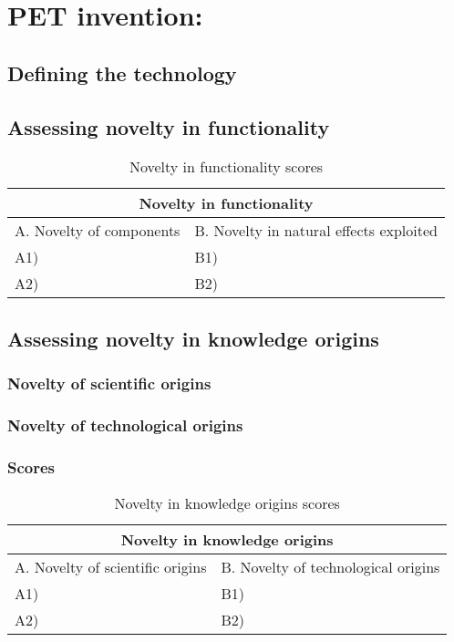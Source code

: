 \section{PET invention: }
\subsection{Defining the technology}

\subsection{Assessing novelty in functionality}
\begin{table}[h]
\centering
\begin{tabular}{l l}
\hline
\multicolumn{2}{|c|}{Novelty in functionality} \\
\hline
A. Novelty of components & B. Novelty in natural effects exploited\\
A1) & B1)\\ 
A2) & B2)\\ 
\hline
\end{tabular}
\caption{Novelty in functionality scores}
\label{tbl:funcscores4}
\end{table}

\subsection{Assessing novelty in knowledge origins}
\subsubsection{Novelty of scientific origins}

\subsubsection{Novelty of technological origins}

\subsubsection{Scores}
\begin{table}[h]
\centering
\begin{tabular}{l l}
\hline
\multicolumn{2}{|c|}{Novelty in knowledge origins} \\
\hline
A. Novelty of scientific origins & B. Novelty of technological origins\\
A1) & B1)\\ 
A2) & B2)\\ 
\hline
\end{tabular}
\caption{Novelty in knowledge origins scores}
\label{tbl:origscores4}
\end{table}

